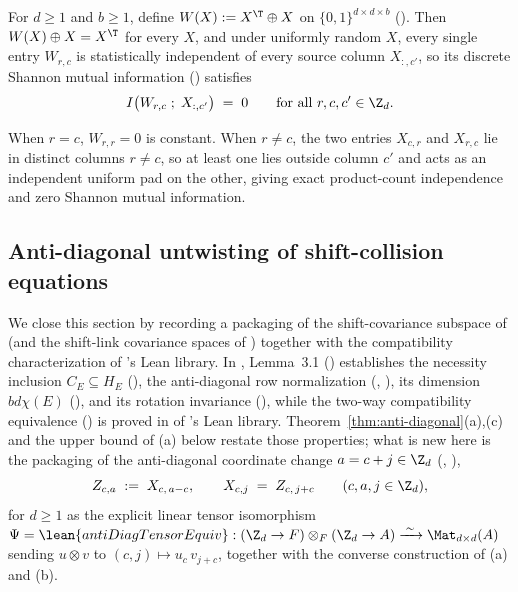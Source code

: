\begin{proposition}\label{prop:otp-control}
For $d \ge 1$ and $b \ge 1$, define $W(X) := X^{\T} \oplus X$ on $\{0,1\}^{d\times d\times b}$
(). Then $W(X) \oplus X = X^{\T}$ for every $X$, and under uniformly random $X$,
every single entry $W_{r,c}$ is statistically independent of every source column $X_{:, c'}$, so its
discrete Shannon mutual information () satisfies
\[
  I\bigl(W_{r,c}\;;\; X_{:,c'}\bigr) \;=\; 0
  \qquad
  \text{for all } r, c, c' \in \Z_d.
\]
\end{proposition}
\begin{outline}
When $r = c$, $W_{r,r} = 0$ is constant. When $r \ne c$, the two entries $X_{c,r}$ and $X_{r,c}$ lie
in distinct columns $r \ne c$, so at least one lies outside column $c'$ and acts as an independent
uniform pad on the other, giving exact product-count independence and zero Shannon mutual
information.
\end{outline}

\subsection{Anti-diagonal untwisting of shift-collision equations}\label{sec:antidiag}

We close this section by recording a  packaging of the shift-covariance
subspace of \cite[Lemma~3.1]{SharedDecoders2026} (and the shift-link covariance spaces of
\cite[Section~6]{SeventeenthPaper2026}) together with the compatibility characterization of
\cite{SharedDecoders2026}'s Lean library. In \cite{SharedDecoders2026}, Lemma~3.1
() establishes the necessity inclusion $C_E \subseteq H_E$
(), the anti-diagonal row
normalization (, ),
its dimension $bd\chi(E)$ (), and its rotation
invariance (), while the two-way compatibility
equivalence () is proved in
 of \cite{SharedDecoders2026}'s Lean library.
Theorem~\ref{thm:anti-diagonal}(a),(c)
and the upper bound of (a) below restate those properties; what is new here
is the packaging of the anti-diagonal coordinate change $a = c + j \in \Z_d$ (,
),
\[
  Z_{c,a} \;:=\; X_{c,\,a - c},
  \qquad
  X_{c,j} \;=\; Z_{c,\,j + c}
  \qquad (c, a, j \in \Z_d),
\]
for $d \ge 1$ as the explicit linear tensor isomorphism
$\Psi = \lean{antiDiagTensorEquiv} : (\Z_d \to F) \otimes_F (\Z_d \to A) \xrightarrow{\;\sim\;}
\Mat_{d\times d}(A)$ sending $u \otimes v$ to $(c, j) \mapsto u_c\,v_{j+c}$, together with the
converse construction of (a) and (b).

